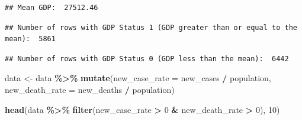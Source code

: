 \documentclass[
]{article}
\newenvironment{Shaded}{\begin{snugshade}}{\end{snugshade}}
\newcommand{\AttributeTok}[1]{\textcolor[rgb]{0.13,0.29,0.53}{#1}}
\newcommand{\DecValTok}[1]{\textcolor[rgb]{0.00,0.00,0.81}{#1}}
\newcommand{\FunctionTok}[1]{\textcolor[rgb]{0.13,0.29,0.53}{\textbf{#1}}}
\newcommand{\NormalTok}[1]{#1}
\newcommand{\OtherTok}[1]{\textcolor[rgb]{0.56,0.35,0.01}{#1}}
\newcommand{\SpecialCharTok}[1]{\textcolor[rgb]{0.81,0.36,0.00}{\textbf{#1}}}
\newcommand{\StringTok}[1]{\textcolor[rgb]{0.31,0.60,0.02}{#1}}
\begin{document}
\begin{verbatim}
## Mean GDP:  27512.46
\end{verbatim}

\begin{Shaded}
\end{Shaded}

\begin{verbatim}
## Number of rows with GDP Status 1 (GDP greater than or equal to the mean):  5861
\end{verbatim}

\begin{verbatim}
## Number of rows with GDP Status 0 (GDP less than the mean):  6442
\end{verbatim}

\begin{Shaded}
\begin{Highlighting}[]
\NormalTok{data }\OtherTok{\textless{}{-}}\NormalTok{ data }\SpecialCharTok{\%\textgreater{}\%}
  \FunctionTok{mutate}\NormalTok{(}\AttributeTok{new\_case\_rate =}\NormalTok{ new\_cases }\SpecialCharTok{/}\NormalTok{ population,}
         \AttributeTok{new\_death\_rate =}\NormalTok{ new\_deaths }\SpecialCharTok{/}\NormalTok{ population)}

\FunctionTok{head}\NormalTok{(data }\SpecialCharTok{\%\textgreater{}\%} \FunctionTok{filter}\NormalTok{(new\_case\_rate }\SpecialCharTok{\textgreater{}} \DecValTok{0} \SpecialCharTok{\&}\NormalTok{ new\_death\_rate }\SpecialCharTok{\textgreater{}} \DecValTok{0}\NormalTok{), }\DecValTok{10}\NormalTok{)}
\end{Highlighting}
\end{Shaded}
\end{document}

